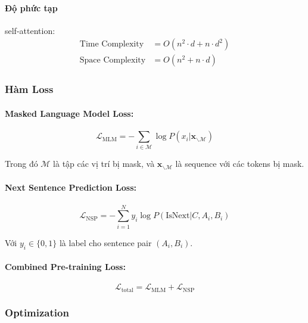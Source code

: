 \paragraph{Độ phức tạp} self-attention:
\begin{align}
\text{Time Complexity} &= O(n^2 \cdot d + n \cdot d^2) \\
\text{Space Complexity} &= O(n^2 + n \cdot d)
\end{align}


\subsubsection{Hàm Loss}
\label{subsubsec:loss_functions}

\paragraph{Masked Language Model Loss:}
\begin{equation}
\mathcal{L}_{\text{MLM}} = -\sum_{i \in \mathcal{M}} \log P(x_i | \mathbf{x}_{\backslash \mathcal{M}})
\label{eq:mlm_loss}
\end{equation}

Trong đó $\mathcal{M}$ là tập các vị trí bị mask, và $\mathbf{x}_{\backslash \mathcal{M}}$ là sequence với các tokens bị mask.

\paragraph{Next Sentence Prediction Loss:}
\begin{equation}
\mathcal{L}_{\text{NSP}} = -\sum_{i=1}^{N} y_i \log P(\text{IsNext} | C, A_i, B_i)
\label{eq:nsp_loss}
\end{equation}

Với $y_i \in \{0, 1\}$ là label cho sentence pair $(A_i, B_i)$.

\paragraph{Combined Pre-training Loss:}
\begin{equation}
\mathcal{L}_{\text{total}} = \mathcal{L}_{\text{MLM}} + \mathcal{L}_{\text{NSP}}
\label{eq:combined_loss}
\end{equation}

\subsubsection{Optimization}
\label{subsubsec:optimization}

